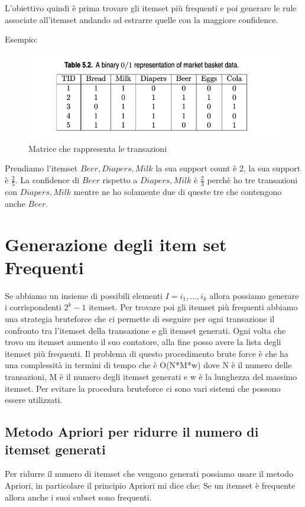 \documentclass[14pt]{extreport}
\begin{document}
L'obiettivo quindi è prima trovare gli itemset più frequenti e poi generare le rule associate all'itemset andando ad estrarre quelle con la maggiore confidence.

Esempio:
\begin{figure}[h!]
  \includegraphics[width=\linewidth]{ConSup.png}
  \caption{Matrice che rappresenta le transazioni}
\end{figure}

Prendiamo l'itemset ${Beer, Diapers, Milk}$ la sua support count è 2, la sua support è $\frac{2}{5}$. La confidence di ${Beer}$ rispetto a ${Diapers, Milk}$ è $\frac{2}{3}$ perchè ho tre transazioni con ${Diapers, Milk}$ mentre ne ho solamente due di queste tre che contengono anche $Beer$.

\section{Generazione degli item set Frequenti}

Se abbiamo un insieme di possibili elementi $I = {i_1,...,i_k}$ allora possiamo generare i corrispondenti $2^k-1$ itemset. Per trovare poi gli itemset più frequenti abbiamo una strategia bruteforce che ci permette di eseguire per ogni transazione il confronto tra l'itemset della transazione e gli itemset generati. Ogni volta che trovo un itemset aumento il suo contatore, alla fine posso avere la lista degli itemset più frequenti. Il problema di questo procedimento brute force è che ha una complessità in termini di tempo che è O(N*M*w) dove N è il numero delle transazioni, M è il numero degli itemset generati e w è la lunghezza del massimo itemset.
Per evitare la procedura bruteforce ci sono vari sistemi che possono essere utilizzati.

\subsection{Metodo Apriori per ridurre il numero di itemset generati}

Per ridurre il numero di itemset che vengono generati possiamo usare il metodo Apriori, in particolare il principio Apriori mi dice che:
\newline    
Se un itemset è frequente allora anche i suoi subset sono frequenti.
\end{document}
